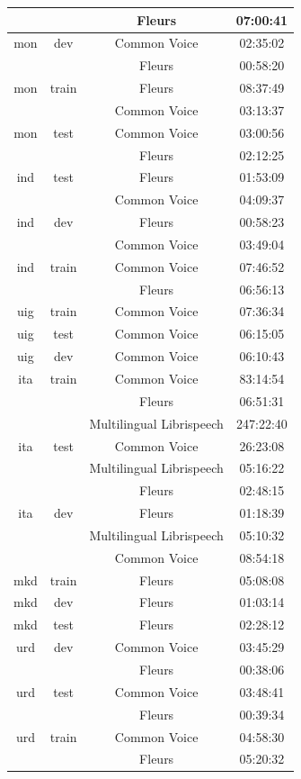 \begin{longtable}{cccc}
 & & Fleurs & 07:00:41 \\ \midrule
mon & dev & Common Voice & 02:35:02 \\ 
 & & Fleurs & 00:58:20 \\ 
mon & train & Fleurs & 08:37:49 \\ 
 & & Common Voice & 03:13:37 \\ 
mon & test & Common Voice & 03:00:56 \\ 
 & & Fleurs & 02:12:25 \\ \midrule
ind & test & Fleurs & 01:53:09 \\ 
 & & Common Voice & 04:09:37 \\ 
ind & dev & Fleurs & 00:58:23 \\ 
 & & Common Voice & 03:49:04 \\ 
ind & train & Common Voice & 07:46:52 \\ 
 & & Fleurs & 06:56:13 \\ \midrule
uig & train & Common Voice & 07:36:34 \\ 
uig & test & Common Voice & 06:15:05 \\ 
uig & dev & Common Voice & 06:10:43 \\ \midrule
ita & train & Common Voice & 83:14:54 \\ 
 & & Fleurs & 06:51:31 \\ 
 & & Multilingual Librispeech & 247:22:40 \\ 
ita & test & Common Voice & 26:23:08 \\ 
 & & Multilingual Librispeech & 05:16:22 \\ 
 & & Fleurs & 02:48:15 \\ 
ita & dev & Fleurs & 01:18:39 \\ 
 & & Multilingual Librispeech & 05:10:32 \\ 
 & & Common Voice & 08:54:18 \\ \midrule
mkd & train & Fleurs & 05:08:08 \\ 
mkd & dev & Fleurs & 01:03:14 \\ 
mkd & test & Fleurs & 02:28:12 \\ \midrule
urd & dev & Common Voice & 03:45:29 \\ 
 & & Fleurs & 00:38:06 \\ 
urd & test & Common Voice & 03:48:41 \\ 
 & & Fleurs & 00:39:34 \\ 
urd & train & Common Voice & 04:58:30 \\ 
 & & Fleurs & 05:20:32 \\ \midrule

\end{longtable}
